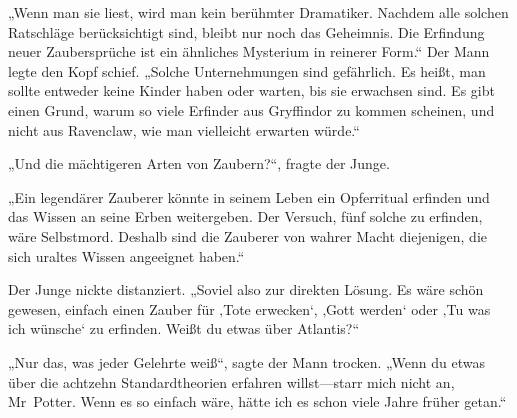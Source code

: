 „Wenn man sie liest, wird man kein berühmter Dramatiker. Nachdem alle solchen Ratschläge berücksichtigt sind, bleibt nur noch das Geheimnis. Die Erfindung neuer Zaubersprüche ist ein ähnliches Mysterium in reinerer Form.“
Der Mann legte den Kopf schief.
„Solche Unternehmungen sind gefährlich. Es heißt, man sollte entweder keine Kinder haben oder warten, bis sie erwachsen sind. Es gibt einen Grund, warum so viele Erfinder aus Gryffindor zu kommen scheinen, und nicht aus Ravenclaw, wie man vielleicht erwarten würde.“

„Und die mächtigeren Arten von Zaubern?“, fragte der Junge.

„Ein legendärer Zauberer könnte in seinem Leben ein Opferritual erfinden und das Wissen an seine Erben weitergeben. Der Versuch, fünf solche zu erfinden, wäre Selbstmord. Deshalb sind die Zauberer von wahrer Macht diejenigen, die sich uraltes Wissen angeeignet haben.“

Der Junge nickte distanziert.
„Soviel also zur direkten Lösung. Es wäre schön gewesen, einfach einen Zauber für ‚Tote erwecken‘, ‚Gott werden‘ oder ‚Tu was ich wünsche‘ zu erfinden. Weißt du etwas über Atlantis?“

„Nur das, was jeder Gelehrte weiß“, sagte der Mann trocken. „Wenn du etwas über die achtzehn Standardtheorien erfahren willst—starr mich nicht an, Mr~Potter. Wenn es so einfach wäre, hätte ich es schon viele Jahre früher getan.“

